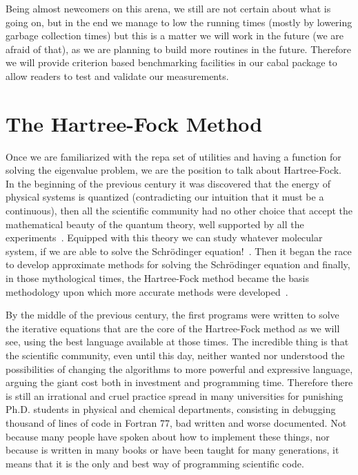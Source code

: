 \documentclass{tmr}
\begin{document}
Being almost newcomers on this arena, we still are not certain about what is going on, but in the end we manage to low the 
running times (mostly by lowering garbage collection times) but this is a matter we will work in the future 
(we are afraid of that), as we are planning to build more routines in the future. Therefore we will provide
 criterion based benchmarking facilities in our cabal package to allow readers to test and validate our measurements.

\section{The Hartree-Fock Method}

Once we are familiarized with the repa set of utilities and having
a function for solving the eigenvalue problem, we are the position to talk about
Hartree-Fock. In the beginning of the previous century it was discovered
that the energy of physical systems is quantized (contradicting our intuition
that it must be a continuous), then all the scientific community had no other choice that accept
the mathematical beauty of the quantum theory, well supported by all the experiments~\cite{quantum}.
 Equipped with this theory we can study whatever molecular system,
if we are able to solve the Schr\"{o}dinger equation!~\cite{Schrodinger}.
Then it began the race to develop approximate methods for solving the Schr\"{o}dinger equation and
finally, in those mythological times, the Hartree-Fock method became
the basis methodology upon which more accurate methods were developed~\cite{hartree-fock}.
 
\par By the middle of the previous century, the first programs were written to solve the 
iterative equations that are the core of the Hartree-Fock method as we will see, using
the best language available at those times. The incredible thing is that the scientific community, even until
this day, neither wanted nor understood the possibilities of changing the algorithms to 
more powerful and expressive language, arguing the giant cost both in investment and programming time. Therefore 
there is still an irrational and cruel practice spread in many universities for punishing Ph.D. students
in physical and chemical departments, consisting in debugging thousand of lines of code in Fortran 77,
bad written and worse documented. Not because many people have spoken about how to implement
these things, nor because is written in many books or have been taught 
for many generations, it means that it is the only and best way of programming scientific code.
\end{document}
